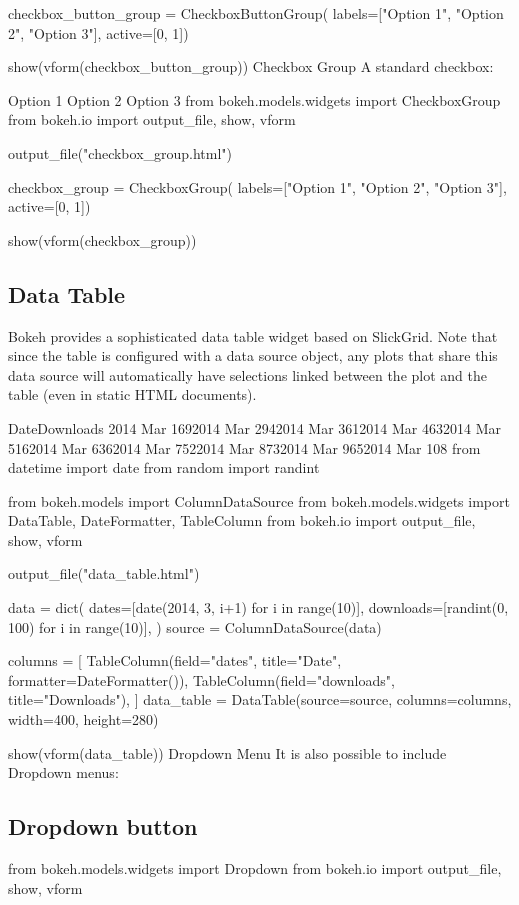checkbox_button_group = CheckboxButtonGroup(
        labels=["Option 1", "Option 2", "Option 3"], active=[0, 1])

show(vform(checkbox_button_group))
Checkbox Group
A standard checkbox:

Option 1
Option 2
Option 3
from bokeh.models.widgets import CheckboxGroup
from bokeh.io import output_file, show, vform

output_file("checkbox_group.html")

checkbox_group = CheckboxGroup(
        labels=["Option 1", "Option 2", "Option 3"], active=[0, 1])

show(vform(checkbox_group))
\subsection{Data Table}
Bokeh provides a sophisticated data table widget based on SlickGrid. Note that since the table is configured with a data source object, any plots that share this data source will automatically have selections linked between the plot and the table (even in static HTML documents).

DateDownloads
2014 Mar 1692014 Mar 2942014 Mar 3612014 Mar 4632014 Mar 5162014 Mar 6362014 Mar 7522014 Mar 8732014 Mar 9652014 Mar 108
from datetime import date
from random import randint

from bokeh.models import ColumnDataSource
from bokeh.models.widgets import DataTable, DateFormatter, TableColumn
from bokeh.io import output_file, show, vform

output_file("data_table.html")

data = dict(
        dates=[date(2014, 3, i+1) for i in range(10)],
        downloads=[randint(0, 100) for i in range(10)],
    )
source = ColumnDataSource(data)

columns = [
        TableColumn(field="dates", title="Date", formatter=DateFormatter()),
        TableColumn(field="downloads", title="Downloads"),
    ]
data_table = DataTable(source=source, columns=columns, width=400, height=280)

show(vform(data_table))
Dropdown Menu
It is also possible to include Dropdown menus:

\subsection{Dropdown button }
from bokeh.models.widgets import Dropdown
from bokeh.io import output_file, show, vform

